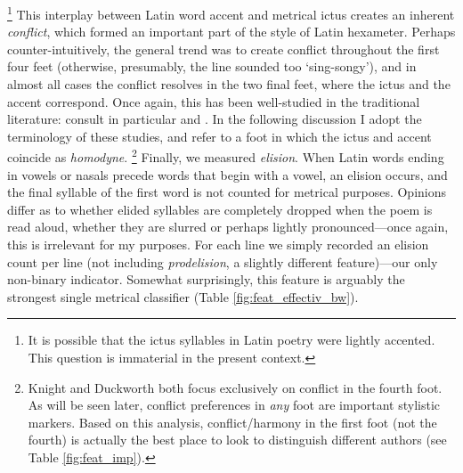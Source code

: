 \documentclass[11pt,a4paper]{scrartcl} %
\begin{document}
{\footnote{It is possible that the ictus syllables in Latin poetry were lightly accented. This question is immaterial in the present context.}
This interplay between Latin word accent and metrical ictus creates an inherent \textit{conflict}, which formed an important part of the style of Latin hexameter. Perhaps counter-intuitively, the general trend was to create conflict throughout the first four feet (otherwise, presumably, the line sounded too `sing-songy'), and in almost all cases the conflict resolves in the two final feet, where the ictus and the accent correspond. Once again, this has been well-studied in the traditional literature: consult in particular \cite{knight_homodyne_1931} and \citet[17-24]{duckworth_vergil_1969}. In the following discussion I adopt the terminology of these studies, and refer to a foot in which the ictus and accent coincide as \textit{homodyne}.%
\footnote{Knight and Duckworth both focus exclusively on conflict in the fourth foot. As will be seen later, conflict preferences in \textit{any} foot are important stylistic markers. Based on this analysis, conflict/harmony in the first foot (not the fourth) is actually the best place to look to distinguish different authors (see Table \ref{fig:feat_imp}).}
Finally, we measured \textit{elision}. When Latin words ending in vowels or nasals precede words that begin with a vowel, an elision occurs, and the final syllable of the first word is not counted for metrical purposes. Opinions differ as to whether elided syllables are completely dropped when the poem is read aloud, whether they are slurred or perhaps lightly pronounced---once again, this is irrelevant for my purposes. For each line we simply recorded an elision count per line (not including \textit{prodelision}, a slightly different feature)---our only non-binary indicator. Somewhat surprisingly, this feature is arguably the strongest single metrical classifier (Table \ref{fig:feat_effectiv_bw}).

}
\end{document}
